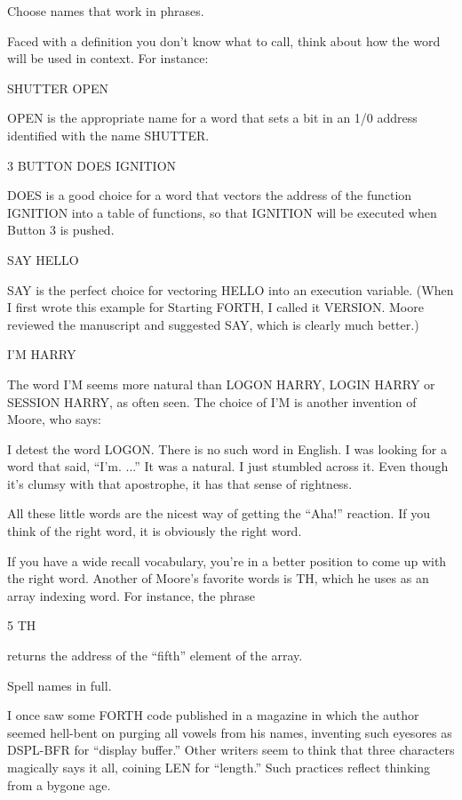 \begin{tip}
Choose names that work in phrases.
\end{tip}
Faced with a definition you don't know what to call, think about how the
word will be used in context.  For instance:
\begin{Code}
SHUTTER OPEN
\end{Code}
OPEN is the appropriate name for a word that sets a
bit in an 1/0 address identified with the name
SHUTTER.
\begin{Code}
3 BUTTON DOES IGNITION
\end{Code}
DOES is a good choice for a word that vectors the
address of the function IGNITION into a table of
functions, so that IGNITION will be executed when
Button 3 is pushed.
\begin{Code}
SAY HELLO
\end{Code}
SAY is the perfect choice for vectoring HELLO into an
execution variable.  (When I first wrote this example
for Starting FORTH, I called it VERSION.  Moore
reviewed the manuscript and suggested SAY, which is
clearly much better.)
\begin{Code}
I'M HARRY
\end{Code}
The word I'M seems more natural than LOGON HARRY,
LOGIN HARRY or SESSION HARRY, as often seen.
The choice of I'M is another invention of Moore, who says:

I detest the word LOGON.  There is no such word in English.  I was looking
for a word that said, ``I'm. ...'' It was a natural.  I just stumbled across it.
Even though it's clumsy with that apostrophe, it has that sense of
rightness.

All these little words are the nicest way of getting the ``Aha!'' reaction.  If
you think of the right word, it is obviously the right word.

If you have a wide recall vocabulary, you're in a better position to come up
with the right word.
Another of Moore's favorite words is TH, which he uses as an array indexing
word.  For instance, the phrase
\begin{Code}
5 TH
\end{Code}
returns the address of the ``fifth'' element of the array.

\begin{tip}
Spell names in full.
\end{tip}
I once saw some FORTH code published in a magazine in which the
author seemed hell-bent on purging all vowels from his names, inventing
such eyesores as DSPL-BFR for ``display buffer.'' Other writers seem to
think that three characters magically says it all, coining LEN for
``length.'' Such practices reflect thinking from a bygone age.

